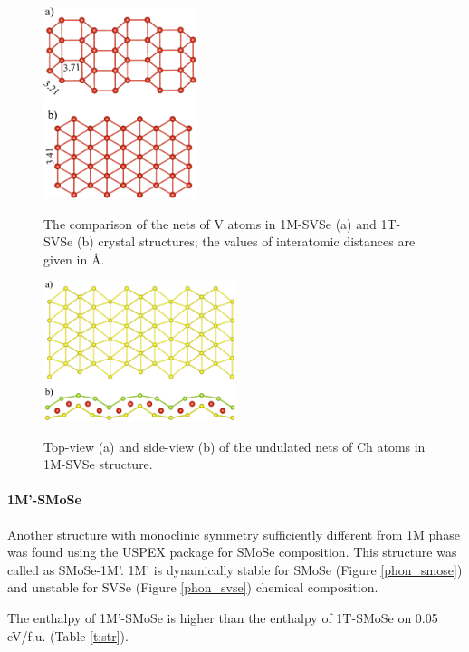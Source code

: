 \documentclass[a4paperm]{article}
\begin{document}
\begin{figure}[H]
	\includegraphics[width=0.4\textwidth]{T_hor_V.png} \\
	\caption{The comparison of the nets of V atoms in 1M-SVSe (a) and 1T-SVSe (b) crystal structures; the values of interatomic distances are given in \AA.}
	\label{T_hor_V}
\end{figure}

\begin{figure}[H]
        \includegraphics[width=0.5\textwidth]{T_hor_hcb.png} \\
        \caption{Top-view (a) and side-view (b) of the undulated nets of Ch atoms in 1M-SVSe structure.}
\label{T_hor_hcb}
\end{figure}



\paragraph{1M'-SMoSe}
Another structure with monoclinic symmetry sufficiently different from 1M phase was found using the USPEX package for SMoSe composition. 
This structure was called as SMoSe-1M'.
1M' is dynamically stable for SMoSe (Figure \ref{phon_smose}) and unstable for SVSe (Figure \ref{phon_svse}) chemical composition.

The enthalpy of 1M'-SMoSe is higher than the enthalpy of 1T-SMoSe on 0.05 eV/f.u. (Table \ref{t:str}). 
\end{document}
